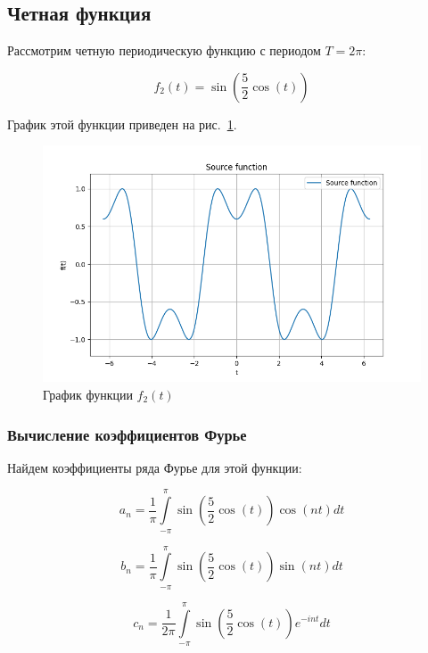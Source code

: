 \subsection{Четная функция}

Рассмотрим четную периодическую функцию с периодом $T = 2\pi$:

\begin{equation}
    f_2(t) = \sin\left(\frac{5}{2} \cos(t)\right)
\end{equation}

График этой функции приведен на рис.~\ref{fig:func_2}.

\begin{figure}[h!]
    \centering
    \includegraphics[width=\textwidth]{media/plots/func_2.png}
    \caption{График функции $f_2(t)$}
    \label{fig:func_2}
\end{figure}

\subsubsection{Вычисление коэффициентов Фурье}
Найдем коэффициенты ряда Фурье для этой функции:

\begin{equation}
    a_n = \frac{1}{\pi}\int\limits_{-\pi}^{\pi} \sin\left(\frac{5}{2} \cos\left(t\right)\right)\cos\left( n t \right) dt 
\end{equation}

\begin{equation}
    b_n = \frac{1}{\pi}\int\limits_{-\pi}^{\pi} \sin\left(\frac{5}{2} \cos\left(t\right)\right)\sin\left( n t \right) dt 
\end{equation}

\begin{equation}
    c_n = \frac{1}{2\pi}\int\limits_{-\pi}^{\pi}  \sin\left(\frac{5}{2} \cos\left(t\right)\right) e^{-int} dt 
\end{equation}

